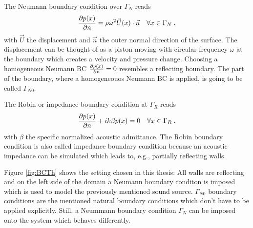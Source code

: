 \documentclass[%
  a4paper,oneside,%
  11pt,%
  smallchapters,
  style=printdev,
  extramargin,
  green,%
  rgb, <cmyk>
  ]{tubsbook}
\begin{document}
	
The Neumann boundary condition over $\Gamma_N$ reads
\begin{equation}
\pdv{p(x)}{n} = \rho \omega^2 \vec{U}(x) \cdot \vec{n} \quad \forall x \in \Gamma_N \;,
\label{eqn:NeumannBCDef}
\end{equation}
with $\vec{U}$ the displacement and $\vec{n}$ the outer normal direction of the surface. The displacement can be thought of as a piston moving with circular frequency $\omega$ at the boundary which creates a velocity and pressure change. Choosing a homogeneous Neumann BC $\pdv{p(x)}{n} = 0$ resembles a reflecting boundary. The part of the boundary, where a homogeneouos Neumann BC is applied, is going to be called $\Gamma_{N0}$.

The Robin or impedance boundary condition at $\Gamma_R$ reads
\begin{equation}
\pdv{p(x)}{n} + ik \beta p(x) = 0 \quad \forall x \in \Gamma_R \;,
\end{equation}
with $\beta$ the specific normalized acoustic admittance. The Robin boundary condition is also called impedance boundary condition because an acoustic impedance can be simulated which leads to, e.g., partially reflecting walls.


Figure \ref{fig:BCTh} shows the setting chosen in this thesis: All walls are reflecting and on the left side of the domain a Neumann boundary conditon is imposed which is used to model the previously mentioned sound source. 
$\Gamma_{N0}$ boundary conditions are the mentioned natural boundary conditions which don't have to be applied explicitly. Still, a Neummann boundary condition $\Gamma_{N}$ can be imposed onto the system which behaves differently. 

\end{document}
